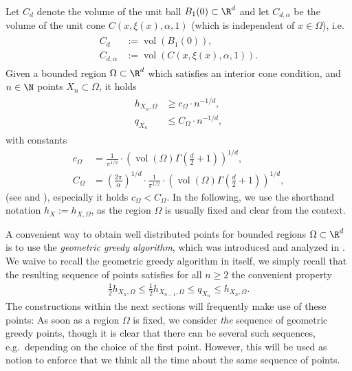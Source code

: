 \documentclass[a4paper, 10pt]{article}
\DeclareMathOperator{\vol}{vol}
\begin{document}
Let $C_d$ denote the volume of the unit ball $B_1(0) \subset \R^d$ and let $C_{d, \alpha}$ be the volume of the unit cone $C(x, \xi(x), \alpha, 1)$ (which is independent of $x \in \Omega$), i.e.\
\begin{align}
\label{eq:constants_ball_cone}
\begin{aligned}
C_d &:= \vol(B_1(0)), \\
C_{d, \alpha} &:= \vol(C(x, \xi(x), \alpha, 1)).
\end{aligned}
\end{align}
Given a bounded region $\Omega \subset \R^d$ which satisfies an interior cone condition, 
and $n \in \N$ points $X_n \subset \Omega$, 
it holds
%
%
\begin{align}
\label{eq:geometric_bounds}
\begin{aligned}
h_{X_n, \Omega} &\geq c_{\Omega} \cdot n^{-1/d}, \\
q_{X_n} &\leq C_{\Omega} \cdot n^{-1/d},
\end{aligned}
\end{align}
with constants
\begin{align*}
c_\Omega &= \frac{1}{\pi^{1/2}} \cdot \left( \vol(\Omega) \Gamma \left( \frac{d}{2} + 1 \right) \right)^{1/d}, \\
C_\Omega &= \left( \frac{2\pi}{\alpha} \right)^{1/d} \cdot \frac{1}{\pi^{1/2}} \cdot \left( \vol(\Omega) \Gamma \left( \frac{d}{2} + 1 \right) \right)^{1/d},
\end{align*}
(see \cite[Satz 2.1.6]{mueller2009komplexitaet} and \cite[Satz 2.1.7]{mueller2009komplexitaet}), especially it holds $c_\Omega < C_\Omega$. 
In the following,
we use the shorthand notation $h_X := h_{X, \Omega}$, as the region $\Omega$ is usually fixed and clear from the context.



A convenient way to obtain well distributed points for bounded regions $\Omega \subset \R^d$ is to use the \textit{geometric greedy algorithm}, 
which was introduced and analyzed in \cite{marchi2005optimal}.
We waive to recall the geometric greedy algorithm in itself, we simply recall that the resulting sequence of points satisfies for all $n \geq 2$ the convenient property \cite[Lemma 5.1]{marchi2005optimal}
\begin{align}
\label{eq:geometric_uniformity}
\frac{1}{2} h_{X_n, \Omega} \leq \frac{1}{2} h_{X_{n-1}, \Omega} \leq q_{X_n} \leq h_{X_n, \Omega}.
\end{align}
%
%
The constructions within the next sections will frequently make use of these points:
As soon as a region $\Omega$ is fixed, 
we consider \textit{the} sequence of geometric greedy points, 
though it is clear that there can be several such sequences, e.g.\ depending on the choice of the first point.
However, this will be used as notion to enforce that we think all the time about the same sequence of points.
\end{document}
